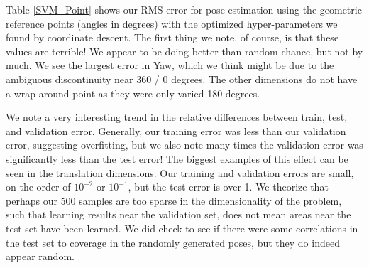 \documentclass[journal]{IEEEtran}
\begin{document}
Table \ref{SVM_Point} shows our RMS error for pose estimation using the geometric reference points (angles in degrees) with the optimized hyper-parameters we found by coordinate descent. The first thing we note, of course, is that these values are terrible! We appear to be doing better than random chance, but not by much. We see the largest error in Yaw, which we think might be due to the ambiguous discontinuity near 360 / 0 degrees. The other dimensions do not have a wrap around point as they were only varied 180 degrees.

We note a very interesting trend in the relative differences between train, test, and validation error. Generally, our training error was less than our validation error, suggesting overfitting, but we also note many times the validation error was significantly less than the test error! The biggest examples of this effect can be seen in the translation dimensions. Our training and validation errors are small, on the order of $10^{-2}$ or $10^{-1}$, but the test error is over 1. We theorize that perhaps our 500 samples are too sparse in the dimensionality of the problem, such that learning results near the validation set, does not mean areas near the test set have been learned. We did check to see if there were some correlations in the test set to coverage in the randomly generated poses, but they do indeed appear random.
\end{document}
